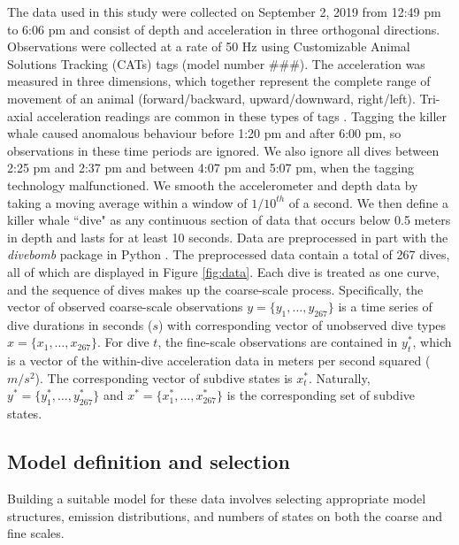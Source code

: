 The data used in this study were collected on September 2, 2019 from 12:49 pm to 6:06 pm and consist of depth and acceleration in three orthogonal directions. Observations were collected at a rate of 50 Hz using Customizable Animal Solutions Tracking (CATs) tags (model number ###). The acceleration was measured in three dimensions, which together represent the complete range of movement of an animal (forward/backward, upward/downward, right/left). Tri-axial acceleration readings are common in these types of tags \citep{Cade:2017,Fehlmann:2017,Wright:2017}. Tagging the killer whale caused anomalous behaviour before 1:20 pm and after 6:00 pm, so observations in these time periods are ignored. We also ignore all dives between 2:25 pm and 2:37 pm and between 4:07 pm and 5:07 pm, when the tagging technology malfunctioned. We smooth the accelerometer and depth data by taking a moving average within a window of $1/10^{th}$ of a second. We then define a killer whale ``dive" as any continuous section of data that occurs below 0.5 meters in depth and lasts for at least 10 seconds. Data are preprocessed in part with the \textit{divebomb} package in Python \citep{Nunes:2018}. The preprocessed data contain a total of 267 dives, all of which are displayed in Figure \ref{fig:data}. Each dive is treated as one curve, and the sequence of dives makes up the coarse-scale process. Specifically, the vector of observed coarse-scale observations $y = \Big\{y_1,\ldots,y_{267}\Big\}$ is a time series of dive durations in seconds ($s$) with corresponding vector of unobserved dive types $x = \Big\{x_1,\ldots,x_{267}\Big\}$. For dive $t$, the fine-scale observations are contained in $y^*_{t}$, which is a vector of the within-dive acceleration data in meters per second squared ($m/s^2$). The corresponding vector of subdive states is $x^*_{t}$. Naturally, $y^* = \Big\{y^*_1,\ldots,y^*_{267}\Big\}$ and $x^* = \Big\{x^*_1,\ldots,x^*_{267}\Big\}$ is the corresponding set of subdive states.

\subsection{Model definition and selection}

Building a suitable model for these data involves selecting appropriate model structures, emission distributions, and numbers of states on both the coarse and fine scales. 

